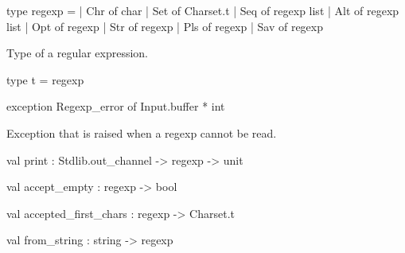 \documentclass[11pt]{article}
\begin{document}
\label{type:Regexp.regexp}\begin{ocamldoccode}
type regexp =
  | Chr of char
  | Set of Charset.t
  | Seq of regexp list
  | Alt of regexp list
  | Opt of regexp
  | Str of regexp
  | Pls of regexp
  | Sav of regexp
\end{ocamldoccode}
\begin{ocamldocdescription}
Type of a regular expression.


\end{ocamldocdescription}




\label{type:Regexp.t}\begin{ocamldoccode}
type t = regexp 
\end{ocamldoccode}




\label{exception:Regexp.Regexp-underscoreerror}\begin{ocamldoccode}
exception Regexp_error of Input.buffer * int
\end{ocamldoccode}
\begin{ocamldocdescription}
Exception that is raised when a regexp cannot be read.


\end{ocamldocdescription}




\label{val:Regexp.print}\begin{ocamldoccode}
val print : Stdlib.out_channel -> regexp -> unit
\end{ocamldoccode}




\label{val:Regexp.accept-underscoreempty}\begin{ocamldoccode}
val accept_empty : regexp -> bool
\end{ocamldoccode}




\label{val:Regexp.accepted-underscorefirst-underscorechars}\begin{ocamldoccode}
val accepted_first_chars : regexp -> Charset.t
\end{ocamldoccode}




\label{val:Regexp.from-underscorestring}\begin{ocamldoccode}
val from_string : string -> regexp
\end{ocamldoccode}
\end{document}

